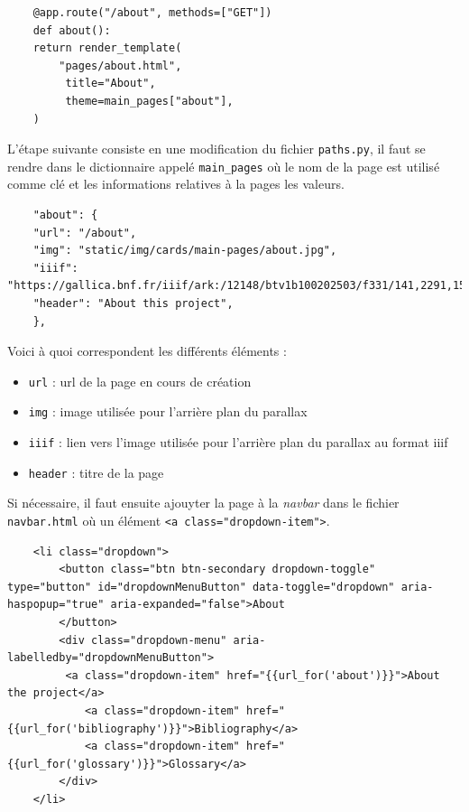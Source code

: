     \begin{verbatim}
    @app.route("/about", methods=["GET"])
    def about():
    return render_template(
        "pages/about.html",
         title="About",
         theme=main_pages["about"],
    )
    \end{verbatim}

    L'étape suivante consiste en une modification du fichier \texttt{paths.py}, il faut se rendre dans le dictionnaire appelé \texttt{main\_pages} où le nom de la page est utilisé comme clé et les informations relatives à la pages les valeurs.

    \begin{verbatim}
    "about": {
    "url": "/about",
    "img": "static/img/cards/main-pages/about.jpg",
    "iiif": "https://gallica.bnf.fr/iiif/ark:/12148/btv1b100202503/f331/141,2291,1533,672/full/0/native.jpg",
    "header": "About this project",
    },
    \end{verbatim}

    Voici à quoi correspondent les différents éléments :
    \begin{itemize}
    \item \texttt{url} : \acrshort{url} de la page en cours de création
    \item \texttt{img} : image utilisée pour l'arrière plan du parallax
    \item \texttt{iiif} : lien vers l'image utilisée pour l'arrière plan du parallax au format \acrshort{iiif}
    \item \texttt{header} : titre de la page
    \end{itemize} 

    Si nécessaire, il faut ensuite ajouyter la page à la \textit{navbar} dans le fichier \texttt{navbar.html} où un élément \texttt{<a class="dropdown-item">}.

    \begin{verbatim}
    <li class="dropdown">
        <button class="btn btn-secondary dropdown-toggle" type="button" id="dropdownMenuButton" data-toggle="dropdown" aria-haspopup="true" aria-expanded="false">About
        </button>
        <div class="dropdown-menu" aria-labelledby="dropdownMenuButton">
         <a class="dropdown-item" href="{{url_for('about')}}">About the project</a>
            <a class="dropdown-item" href="{{url_for('bibliography')}}">Bibliography</a>
            <a class="dropdown-item" href="{{url_for('glossary')}}">Glossary</a>
        </div>
    </li>
    \end{verbatim}

